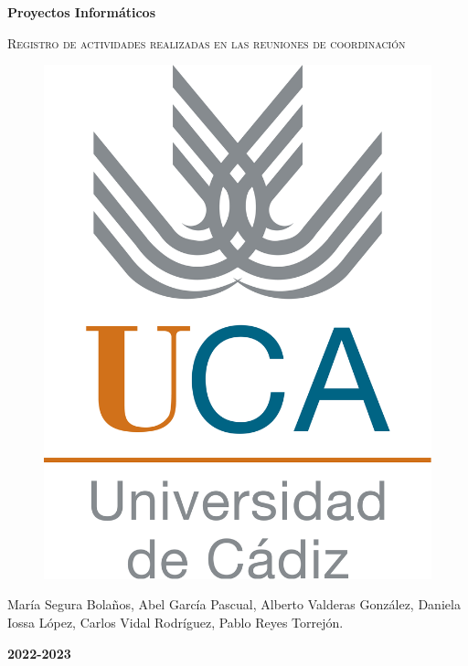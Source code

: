 \documentclass[12pt]{article}
\begin{document}
\begin {titlepage}
\centering
\pagecolor{white}
\vspace*{1cm}
{\bfseries\Huge Proyectos Informáticos \par}
{\scshape\huge Registro de actividades realizadas en las reuniones de coordinación \par}
\vspace*{2cm}
\begin{figure}[h]
\begin{center}
\includegraphics[scale=.4]{logo_uca.jpg}
\end{center}
\end{figure}

\vfill
{\large María Segura Bolaños, Abel García Pascual, Alberto Valderas González, Daniela Iossa López, Carlos Vidal Rodríguez, Pablo Reyes Torrejón.\par}
{\large \textbf{2022-2023} \par}
\end{titlepage}
\end{document}
